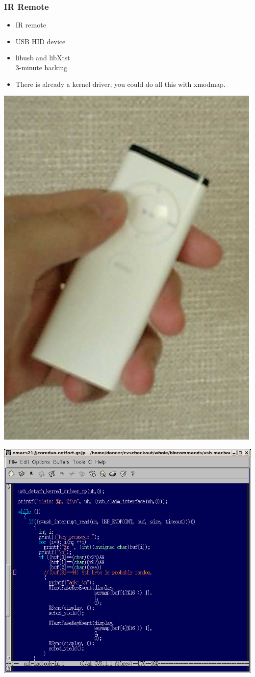 \documentclass[cjk,dvipdfmx]{beamer}
\begin{document}
\begin{frame}
 \frametitle{IR Remote}

\begin{minipage}[t]{0.4\hsize}
  \begin{itemize}
  \item<1-> IR remote\\
  \item<1-> USB HID device
  \item<2-> libusb and libXtst\\
       3-minute hacking
  \item<3-> There is already a kernel driver, you could do all this with
       xmodmap.
 \end{itemize}

      \includegraphics[width=0.4\hsize]{image200607/remote.png}

\end{minipage}
\begin{minipage}[t]{0.5\hsize}
 \includegraphics[width=2\hsize]{image200607/usbir.png}
\end{minipage}
\end{frame}
\end{document}
